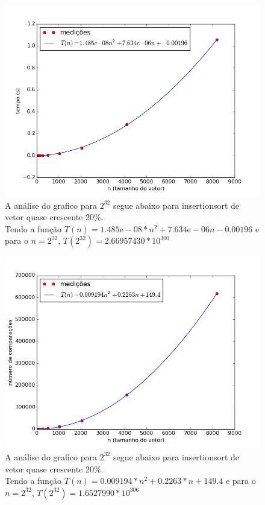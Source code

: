 \documentclass[12pt,a4paper,twoside]{report}
\begin{document}


\begin{figure}[ht]
\centering \includegraphics[scale=0.8]{../insertionsort/imagens/insertionsortQuaseCresc200.png}
\caption{A análise do grafico para $2^{32}$ segue abaixo para insertionsort de vetor quase crescente 20\%.\\
Tendo a função $T(n) = 1.485\mathrm{e}-08*n^2+7.634\mathrm{e}-06n -0.00196$ e para o $n =2^{32}$, $T(2^{32}) = 2.66957430 * 10^{300}$}
\label{fig:insertionsortQuaseCresc200}
\end{figure}

\begin{figure}[ht]
\centering \includegraphics[scale=0.8]{../insertionsort/imagens/insertionsortQuaseCresc201.png}
\caption{A análise do grafico para $2^{32}$ segue abaixo para insertionsort de vetor quase crescente 20\%.\\
Tendo a função $T(n) = 0.009194*n^2+0.2263*n+149.4$ e para o $n =2^{32}$, $T(2^{32}) = 1.6527990 * 10^{306}$}
\label{fig:insertionsortQuaseCresc201}
\end{figure}
\end{document}
